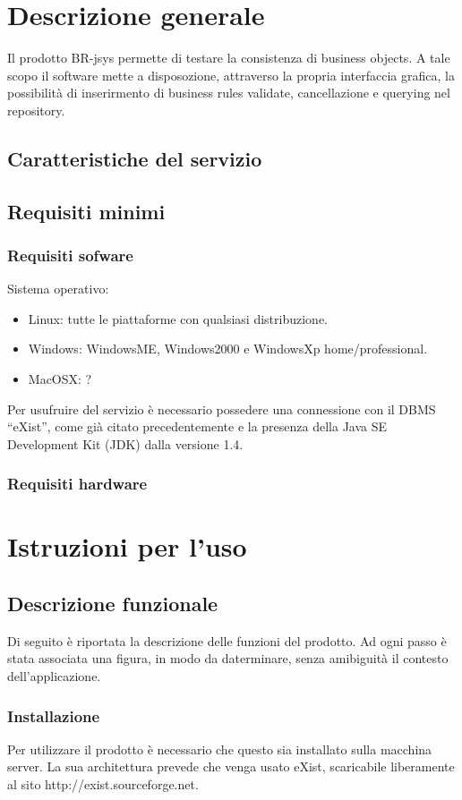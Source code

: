 \chapter{Descrizione generale}
Il prodotto BR-jsys permette di testare la consistenza di business objects. A tale scopo il software mette a disposozione, attraverso la propria interfaccia grafica, la possibilità di inserirmento di business rules validate, cancellazione e querying nel repository.
\section{Caratteristiche del servizio}


\section{Requisiti minimi}
\subsection{Requisiti sofware}
Sistema operativo:\\
\begin{itemize}
\item Linux: tutte le piattaforme con qualsiasi distribuzione.
\item Windows: WindowsME, Windows2000 e WindowsXp home/professional.
\item MacOSX: ?
\end{itemize}
Per usufruire del servizio \`e necessario possedere una connessione con il DBMS ``eXist'', come gi\`a citato precedentemente e la presenza della Java SE Development Kit (JDK) dalla versione 1.4.
\subsection{Requisiti hardware}

\chapter{Istruzioni per l'uso}
\section{Descrizione funzionale}
Di seguito \`e riportata la descrizione delle funzioni del prodotto. Ad ogni passo \`e stata associata una figura, in modo da daterminare, senza amibiguit\`a il contesto dell'applicazione.
\subsection{Installazione}
Per utilizzare il prodotto \`e necessario che questo sia installato sulla macchina server. La sua architettura prevede che venga usato eXist, scaricabile liberamente al sito http://exist.sourceforge.net.
